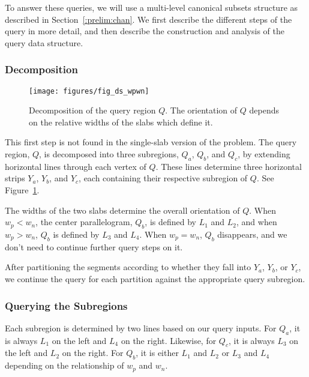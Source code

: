 To answer these queries, we will use a multi-level canonical subsets structure as described in Section~\ref{:prelim:chan}. We first describe the different steps of the query in more detail, and then describe the construction and analysis of the query data structure.


\subsubsection{Decomposition}

\begin{figure}[t]
\begin{center}
  \texttt{[image: figures/fig\_ds\_wpwn]}
  \caption[Decomposition of the query region $Q$.]{Decomposition of the query region $Q$. The orientation of $Q$ depends on the relative widths of the slabs which define it.}
  \label{fig:slabs:two:wpwn}
\end{center}
\end{figure}

This first step is not found in the single-slab version of the problem. The query region, $Q$, is decomposed into three subregions, $Q_a$, $Q_b$, and $Q_c$, by extending horizontal lines through each vertex of $Q$. These lines determine three horizontal strips $Y_a$, $Y_b$, and $Y_c$, each containing their respective subregion of $Q$. See Figure~\ref{fig:slabs:two:wpwn}.

The widths of the two slabs determine the overall orientation of $Q$. When $w_p < w_n$, the center parallelogram, $Q_b$, is defined by $L_1$ and $L_2$, and when $w_p > w_n$, $Q_b$ is defined by $L_3$ and $L_4$. When $w_p = w_n$, $Q_b$ disappears, and we don't need to continue further query steps on it.

After partitioning the segments according to whether they fall into $Y_a$, $Y_b$, or $Y_c$, we continue the query for each partition against the appropriate query subregion.


\subsubsection{Querying the Subregions}

Each subregion is determined by two lines based on our query inputs. For $Q_a$, it is always $L_1$ on the left and $L_4$ on the right. Likewise, for $Q_c$, it is always $L_3$ on the left and $L_2$ on the right. For $Q_b$, it is either $L_1$ and $L_2$ or $L_3$ and $L_4$ depending on the relationship of $w_p$ and $w_n$.

